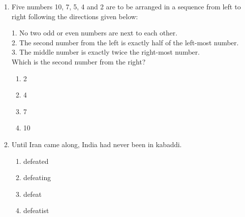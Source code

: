 \documentclass[journal,12pt,onecolumn]{IEEEtran}
\begin{document}
\begin{enumerate}[itemsep=0.5cm]
\hfill{}

\begin{multicols}{4}
\begin{enumerate}
    \item 17.1
    \item 21.0
    \item 33.1
    \item 72.8
\end{enumerate}
\end{multicols}

\item Five numbers 10, 7, 5, 4 and 2 are to be arranged in a sequence from left to right following the directions given below:\\

\vspace{1em}

1. No two odd or even numbers are next to each other.\\
2. The second number from the left is exactly half of the left-most number.\\
3. The middle number is exactly twice the right-most number.\\
Which is the second number from the right?

\hfill{}

\begin{multicols}{2}
\begin{enumerate}
    \item 2
    \item 4
    \item 7
    \item 10
\end{enumerate}
\end{multicols}

\item Until Iran came along, India had never been in kabaddi.

\hfill{}

\begin{multicols}{4}
\begin{enumerate}
    \item defeated
    \item defeating
    \item defeat
    \item defeatist
\end{enumerate}
\end{multicols}

\newpage


\end{enumerate}
\end{document}
